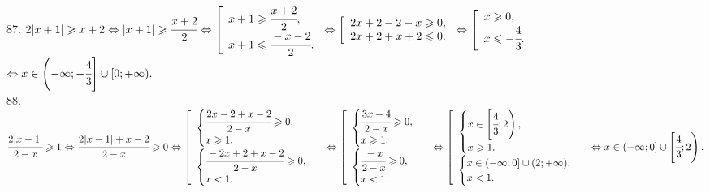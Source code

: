 87. $2|x+1|\geqslant x+2\Leftrightarrow |x+1|\geqslant \cfrac{x+2}{2} \Leftrightarrow \left[\begin{array}{l} x+1\geqslant \cfrac{x+2}{2},\\
x+1\leqslant \cfrac{-x-2}{2}.\end{array}\right. \Leftrightarrow \left[\begin{array}{l} 2x+2-2-x\geqslant 0,\\
2x+2+x+2\leqslant 0.\end{array}\right. \Leftrightarrow \left[\begin{array}{l} x\geqslant 0,\\
x\leqslant -\cfrac{4}{3}.\end{array}\right.$\\$ \Leftrightarrow x\in\left(-\infty;-\cfrac{4}{3}\right]\cup[0;+\infty).$\\
88. $\cfrac{2|x-1|}{2-x}\geqslant1 \Leftrightarrow \cfrac{2|x-1|+x-2}{2-x}\geqslant0\Leftrightarrow
\left[\begin{array}{l}\begin{cases} \cfrac{2x-2+x-2}{2-x}\geqslant0,\\ x\geqslant 1.\end{cases}\\ \begin{cases}\cfrac{-2x+2+x-2}{2-x}\geqslant0,\\ x<1.           \end{cases}\end{array}\right.\Leftrightarrow
\left[\begin{array}{l}\begin{cases} \cfrac{3x-4}{2-x}\geqslant0,\\ x\geqslant 1.\end{cases}\\ \begin{cases}\cfrac{-x}{2-x}\geqslant0,\\ x<1.           \end{cases}\end{array}\right.\Leftrightarrow
\left[\begin{array}{l}\begin{cases} x\in\left[\cfrac{4}{3};2\right),\\ x\geqslant 1.\end{cases}\\ \begin{cases}x\in(-\infty;0]\cup(2;+\infty),\\ x<1.           \end{cases}\end{array}\right.\Leftrightarrow x\in(-\infty;0]\cup\left[\cfrac{4}{3};2\right).$\\
